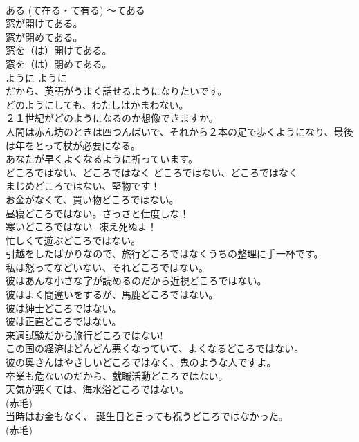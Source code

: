 \documentclass[8pt]{extreport}
\begin{document}
\begin{CJK}{UTF8}{min}
\\	ある (て在る・て有る)	〜てある	
\\	窓が開けてある。  
\\	窓が閉めてある。  
\\	窓を（は）開けてある。  
\\	窓を（は）閉めてある。  
\\	ように	ように	
\\	だから、英語がうまく話せるようになりたいです。  
\\	どのようにしても、わたしはかまわない。  
\\	２１世紀がどのようになるのか想像できますか。  
\\	人間は赤ん坊のときは四つんばいで、それから２本の足で歩くようになり、最後は年をとって杖が必要になる。  
\\	あなたが早くよくなるように祈っています。  
\\	どころではない、どころではなく	どころではない、どころではなく	
\\	まじめどころではない、堅物です！  
\\	お金がなくて、買い物どころではない。  
\\	昼寝どころではない。さっさと仕度しな！  
\\	寒いどころではない- 凍え死ぬよ！  
\\	忙しくて遊ぶどころではない。  
\\	引越をしたばかりなので、旅行どころではなくうちの整理に手一杯です。  
\\	私は怒ってなどいない、それどころではない。   
\\	彼はあんな小さな字が読めるのだから近視どころではない。   
\\	彼はよく間違いをするが、馬鹿どころではない。   
\\	彼は紳士どころではない。   
\\	彼は正直どころではない。   
\\	来週試験だから旅行どころではない!  
\\	この国の経済はどんどん悪くなっていて、よくなるどころではない。   
\\	彼の奥さんはやさしいどころではなく、鬼のような人ですよ。   
\\	卒業も危ないのだから、就職活動どころではない。  
\\	天気が悪くては、海水浴どころではない。  
\\	(赤毛)
\\	当時はお金もなく、 誕生日と言っても祝うどころではなかった。  
\\	(赤毛)

\end{CJK}
\end{document}
